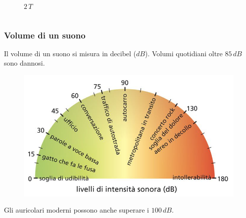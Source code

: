 \documentclass[handout]{beamer}
\theoremstyle{plain}
\begin{document}
\begin{frame}
\begin{columns}
\begin{column}{0.3\textwidth}
\begin{figure}
    $ 2 \, T $
  \end{figure}    
  \end{column}
\end{columns}
\end{frame}



\begin{frame}
\frametitle{Volume di un suono}
Il volume di un suono si misura in decibel ($ dB $). Volumi quotidiani oltre $ 85 \, dB $ sono dannosi.

\begin{figure}
  \includegraphics[width=.8\columnwidth]{img/volume.png}
\end{figure}

Gli auricolari moderni possono anche superare i $ 100 \, dB $.
\end{frame}
\end{document}
